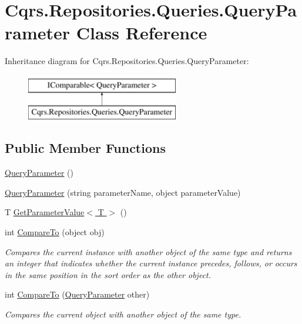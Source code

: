 \hypertarget{classCqrs_1_1Repositories_1_1Queries_1_1QueryParameter}{}\section{Cqrs.\+Repositories.\+Queries.\+Query\+Parameter Class Reference}
\label{classCqrs_1_1Repositories_1_1Queries_1_1QueryParameter}
Inheritance diagram for Cqrs.\+Repositories.\+Queries.\+Query\+Parameter\+:\begin{figure}[H]
\begin{center}
\leavevmode
\includegraphics[height=2.000000cm]{classCqrs_1_1Repositories_1_1Queries_1_1QueryParameter}
\end{center}
\end{figure}
\subsection*{Public Member Functions}
\begin{DoxyCompactItemize}
\item 
\hyperlink{classCqrs_1_1Repositories_1_1Queries_1_1QueryParameter_abf7919fe1130356255ba0b5c4b4f470a_abf7919fe1130356255ba0b5c4b4f470a}{Query\+Parameter} ()
\item 
\hyperlink{classCqrs_1_1Repositories_1_1Queries_1_1QueryParameter_aada69debce3a88b09dfe7739ef22abb4_aada69debce3a88b09dfe7739ef22abb4}{Query\+Parameter} (string parameter\+Name, object parameter\+Value)
\item 
T \hyperlink{classCqrs_1_1Repositories_1_1Queries_1_1QueryParameter_a14f2f14cba8d0807bb80d7b8d2c7e59a_a14f2f14cba8d0807bb80d7b8d2c7e59a}{Get\+Parameter\+Value$<$ T $>$} ()
\item 
int \hyperlink{classCqrs_1_1Repositories_1_1Queries_1_1QueryParameter_a59a2bda12bc0161d0ceb95eb02062d08_a59a2bda12bc0161d0ceb95eb02062d08}{Compare\+To} (object obj)
\begin{DoxyCompactList}\small\item\em Compares the current instance with another object of the same type and returns an integer that indicates whether the current instance precedes, follows, or occurs in the same position in the sort order as the other object. \end{DoxyCompactList}\item 
int \hyperlink{classCqrs_1_1Repositories_1_1Queries_1_1QueryParameter_a48fa36fe6189bb03008b7f9fa3d30267_a48fa36fe6189bb03008b7f9fa3d30267}{Compare\+To} (\hyperlink{classCqrs_1_1Repositories_1_1Queries_1_1QueryParameter}{Query\+Parameter} other)
\begin{DoxyCompactList}\small\item\em Compares the current object with another object of the same type. \end{DoxyCompactList}\end{DoxyCompactItemize}
